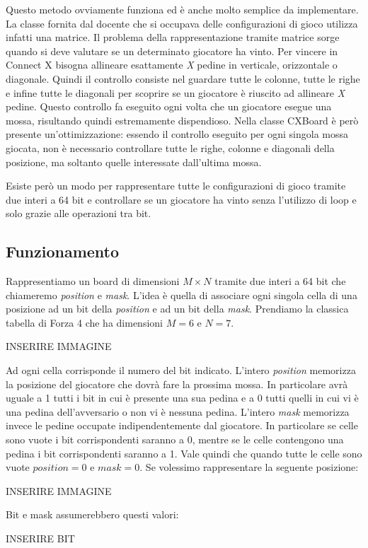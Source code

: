 \documentclass[a4paper]{article}
\begin{document}
Questo metodo ovviamente funziona ed è anche molto semplice da implementare. La
classe fornita dal docente che si occupava delle configurazioni di gioco 
utilizza infatti una matrice. Il problema della rappresentazione tramite matrice
sorge quando si deve valutare se un determinato giocatore ha vinto. Per vincere
in Connect X bisogna allineare esattamente \emph{X} pedine in verticale, 
orizzontale o diagonale. Quindi il controllo consiste nel guardare tutte le 
colonne, tutte le righe e infine tutte le diagonali per scoprire se un giocatore
è riuscito ad allineare \emph{X} pedine. Questo controllo fa eseguito ogni volta
che un giocatore esegue una mossa, risultando quindi estremamente dispendioso.
Nella classe CXBoard è però presente un'ottimizzazione: essendo il controllo 
eseguito per ogni singola mossa giocata, non è necessario controllare tutte le
righe, colonne e diagonali della posizione, ma soltanto quelle interessate 
dall'ultima mossa.

Esiste però un modo per rappresentare tutte le configurazioni di gioco tramite
due interi a 64 bit e controllare se un giocatore ha vinto senza l'utilizzo di
loop e solo grazie alle operazioni tra bit.

\subsection{Funzionamento}
Rappresentiamo un board di dimensioni $M \times N$ tramite due interi a 64 bit
che chiameremo \emph{position} e \emph{mask}. L'idea è quella di associare ogni
singola cella di una posizione ad un bit della \emph{position} e ad un bit della
\emph{mask}. Prendiamo la classica tabella di Forza 4 che ha dimensioni $M = 6$ 
e $N = 7$.

\begin{center}
  INSERIRE IMMAGINE
\end{center}
Ad ogni cella corrisponde il numero del bit indicato. L'intero \emph{position} 
memorizza la posizione del giocatore che dovrà fare la prossima mossa. In 
particolare avrà uguale a 1 tutti i bit in cui è presente una sua pedina e a 0
tutti quelli in cui vi è una pedina dell'avversario o non vi è nessuna pedina. 
L'intero \emph{mask} memorizza invece le pedine occupate indipendentemente dal
giocatore. In particolare se celle sono vuote i bit corrispondenti saranno a 0, 
mentre se le celle contengono una pedina i bit corrispondenti saranno a 1. 
Vale quindi che quando tutte le celle sono vuote $position = 0$ e $mask = 0$. Se 
volessimo rappresentare la seguente posizione:
\begin{center}
  INSERIRE IMMAGINE
\end{center}
Bit e mask assumerebbero questi valori:\medskip
\begin{center}
  INSERIRE BIT
\end{center}
\end{document}
